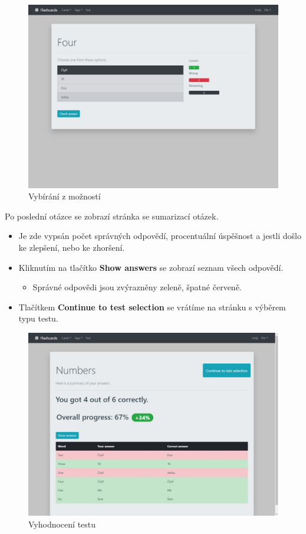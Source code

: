\documentclass[11pt]{article}
\providecommand{\tightlist}{\setlength{\itemsep}{1pt}\setlength{\parskip}{1pt}}
\begin{document}
\begin{figure}
\centering
\includegraphics{../../../../assets/choices.jpg}
\caption{Vybírání z možností}
\end{figure}

Po poslední otázce se zobrazí stránka se sumarizací otázek.

\begin{itemize}
\tightlist
\item
  Je zde vypsán počet správných odpovědí, procentuální úspěšnost a
  jestli došlo ke zlepšení, nebo ke zhoršení.
\item
  Kliknutím na tlačítko \textbf{Show answers} se zobrazí seznam všech
  odpovědí.

  \begin{itemize}
  \tightlist
  \item
    Správné odpovědi jsou zvýrazněny zeleně, špatné červeně.
  \end{itemize}
\item
  Tlačítkem \textbf{Continue to test selection} se vrátíme na stránku s
  výběrem typu testu.
\end{itemize}

\begin{figure}
\centering
\includegraphics{../../../../assets/test_end.jpg}
\caption{Vyhodnocení testu}
\end{figure}
\end{document}
